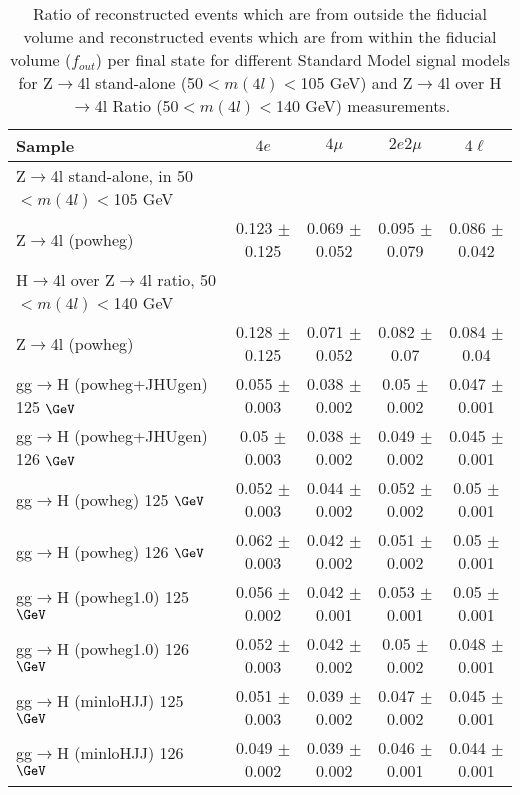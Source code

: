 \begin{sidewaystable}[!h!tb]
\begin{center}
\small
\caption{
Ratio of reconstructed events which are from outside the fiducial volume and reconstructed events which are from within the fiducial volume ($f_{out}$) per final state for different Standard Model signal models for Z$\to$4l stand-alone (50$<m(4l)<$105 GeV) and Z$\to$4l over H$\to$4l Ratio (50$<m(4l)<$140 GeV) measurements.
\label{tab:foutRatio}
}
\begin{tabular}{|l|c|c|c|c|} \hline
Sample & $4e$ & $4\mu$ & $2e2\mu$ & $4\ell$ \\ \hline
Z$\to$4l stand-alone, in 50$<m(4l)<$105 GeV & & & & \\\hline
Z$\to$4l ({\sc powheg})   & 0.123  $\pm$  0.125  & 0.069  $\pm$  0.052  & 0.095  $\pm$  0.079  & 0.086  $\pm$  0.042  \\
\hline\hline
H$\to$4l over Z$\to$4l ratio, 50$<m(4l)<$140 GeV & & & & \\\hline
Z$\to$4l ({\sc powheg})   & 0.128  $\pm$  0.125  & 0.071  $\pm$  0.052  & 0.082  $\pm$  0.07  & 0.084  $\pm$  0.04  \\
gg$\rightarrow$H ({\sc powheg+JHUgen}) 125 $\GeV$  & 0.055  $\pm$  0.003  & 0.038  $\pm$  0.002  & 0.05  $\pm$  0.002  & 0.047  $\pm$  0.001  \\
gg$\rightarrow$H ({\sc powheg+JHUgen}) 126 $\GeV$  & 0.05  $\pm$  0.003  & 0.038  $\pm$  0.002  & 0.049  $\pm$  0.002  & 0.045  $\pm$  0.001  \\
gg$\rightarrow$H ({\sc powheg}) 125 $\GeV$  & 0.052  $\pm$  0.003  & 0.044  $\pm$  0.002  & 0.052  $\pm$  0.002  & 0.05  $\pm$  0.001  \\
gg$\rightarrow$H ({\sc powheg}) 126 $\GeV$  & 0.062  $\pm$  0.003  & 0.042  $\pm$  0.002  & 0.051  $\pm$  0.002  & 0.05  $\pm$  0.001  \\
gg$\rightarrow$H ({\sc powheg1.0}) 125 $\GeV$  & 0.056  $\pm$  0.002  & 0.042  $\pm$  0.001  & 0.053  $\pm$  0.001  & 0.05  $\pm$  0.001  \\
gg$\rightarrow$H ({\sc powheg1.0}) 126 $\GeV$  & 0.052  $\pm$  0.003  & 0.042  $\pm$  0.002  & 0.05  $\pm$  0.002  & 0.048  $\pm$  0.001  \\
gg$\rightarrow$H ({\sc minloHJJ}) 125 $\GeV$  & 0.051  $\pm$  0.003  & 0.039  $\pm$  0.002  & 0.047  $\pm$  0.002  & 0.045  $\pm$  0.001  \\
gg$\rightarrow$H ({\sc minloHJJ}) 126 $\GeV$  & 0.049  $\pm$  0.002  & 0.039  $\pm$  0.002  & 0.046  $\pm$  0.001  & 0.044  $\pm$  0.001  \\

\end{tabular}
\end{center}
\end{sidewaystable}
